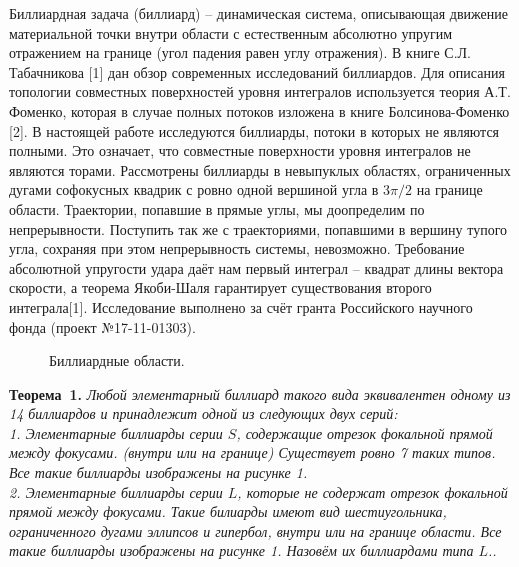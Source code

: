 


\vzmscaption

Биллиардная задача (биллиард) -- динамическая система, описывающая движение материальной точки внутри области с естественным абсолютно упругим отражением на границе (угол падения равен углу отражения). В книге С.Л. Табачникова [1] дан обзор современных исследований биллиардов. Для описания топологии совместных поверхностей уровня интегралов используется теория А.Т. Фоменко, которая в случае полных потоков изложена в книге Болсинова-Фоменко [2]. В настоящей работе ис\-следуют\-ся биллиарды, потоки в которых не являются полными. Это означает, что совместные поверхности уровня интегралов не являются торами. Рассмотрены биллиарды в невыпуклых областях, ограниченных дугами софокусных квадрик с ровно одной вершиной угла в $3\pi/2$ на границе области.
Траектории, попавшие в прямые углы, мы доопределим по непрерывности. Поступить так же с траекториями, попавшими в вершину тупого угла, сохраняя при этом непрерывность системы, невозможно.
Требование абсолютной упругости удара даёт нам первый интеграл -- квадрат длины вектора скорости, а теорема Якоби-Шаля гарантирует существования второго интеграла[1]. Исследование выполнено за счёт гранта Российского научного фонда (проект №17-11-01303).

\begin{figure}[h!]
	\caption{Биллиардные области.}
\end{figure}

\textbf{Теорема~1.} {\it 	Любой элементарный биллиард такого вида эквивалентен одному из 14 биллиардов и принадлежит одной из следующих двух серий: \\
	1. Элементарные биллиарды серии $S$, содержащие отрезок фокальной прямой между фокусами. (внутри или на границе) Существует ровно 7 таких типов. Все такие биллиарды изображены на рисунке 1. \\
	2. Элементарные биллиарды серии $L$, которые не содержат отрезок фокальной прямой между фокусами. Такие билиарды имеют вид шестиугольника, ограниченного дугами эллипсов и гипербол, внутри или на границе области. Все такие биллиарды изображены на рисунке 1. Назовём их биллиардами типа $L$..} \\

